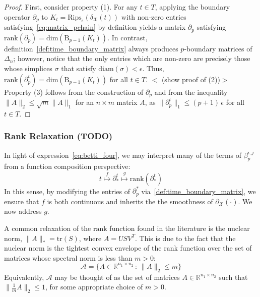 \documentclass[10pt]{article}
\begin{document}
\begin{proof}
First, consider property (1). For any $t \in T$, applying the boundary operator $\partial_p$ to $K_t = \mathrm{Rips}_\epsilon(\delta_{\mathcal{X}}(t))$ with non-zero entries satisfying~\eqref{eq:matrix_pchain} by definition yields a matrix $\partial_p$ satisfying $\mathrm{rank}(\partial_p) = \mathrm{dim}(\mathrm{B}_{p-1}(K_t))$. In contrast, definition~\eqref{def:time_boundary_matrix} always produces $p$-boundary matrices of $\Delta_n$; however, notice that the only entries which are non-zero are precisely those whose simplices $\sigma$ that satisfy $\mathrm{diam}(\sigma) < \epsilon$. Thus, $\mathrm{rank}(\partial_p^t) = \mathrm{dim}(\mathrm{B}_{p-1}(K_t))$ for all $t \in T$. 
$<$ (show proof of (2))$>$
Property (3) follows from the construction of $\partial_p$ and from the inequality $\lVert A \rVert_2 \leq \sqrt{m} \lVert A \rVert_1$ for an $n \times m$ matrix $A$, as $\lVert \partial_p^t \rVert_1 \leq (p+1) \, \epsilon$ for all $t \in T$.

\end{proof}



\subsubsection*{Rank Relaxation (TODO)}
In light of expression~\eqref{eq:betti_four}, we may interpret many of the terms of $\beta_p^{i,j}$ from a function composition perspective: 
$$ t \stackrel{f}{\mapsto} \partial_\ast^t \stackrel{g}{\mapsto} \mathrm{rank}(\partial_\ast^t ) $$
In this sense, by modifying the entries of $\partial_p^\ast$ via~\ref{def:time_boundary_matrix}, we ensure that $f$ is both continuous and inherits the the smoothness of $\partial_\mathcal{X}(\cdot)$. We now address $g$.

A common relaxation of the $\mathrm{rank}$ function found in the literature is the nuclear norm, $\lVert A \rVert_\ast = \mathrm{tr}(S)$, where $A = U S V^T$. This is due to the fact that the nuclear norm is the tightest convex envelope of the $\mathrm{rank}$ function over the set of matrices whose spectral norm is less than $m > 0$:
$$ \mathcal{A} = \{ A \in \mathbb{R}^{n_1 \times n_2} \,:\, \lVert A \rVert_2 \leq m \}$$
Equivalently, $\mathcal{A}$ may be thought of as the set of matrices $A \in \mathbb{R}^{n_1 \times n_2}$ such that $\lVert \frac{1}{m}A\rVert_2 \leq 1$, for some appropriate choice of $m > 0$. 
 
\end{document}
